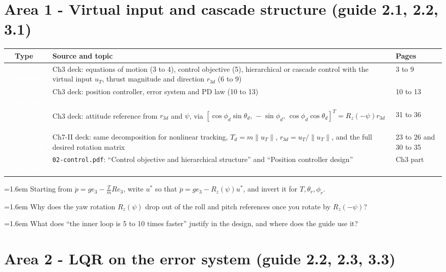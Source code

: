 \documentclass[10pt,a4paper]{article}
\newcommand{\cb}{\raisebox{-0.35ex}{\Large$\square$}}
\newcommand{\srctag}[2]{\colorbox{#1}{\textcolor{white}{\textbf{\scriptsize\,#2\,}}}}
\newcommand{\SLIDES}{\srctag{slides}{SLIDES}}
\newcommand{\NOTES}{\srctag{notes}{NOTES}}
\newcommand{\chk}[1]{\par\noindent\hangindent=1.6em\hangafter=1 \cb\hspace{0.6em}#1}
\begin{document}
\section*{Area 1 - Virtual input and cascade structure \hfill\normalfont\small (guide 2.1, 2.2, 3.1)}

\begin{tabularx}{\textwidth}{@{}C T X l@{}}
\toprule
\cb & Type & Source and topic & Pages\\
\midrule
\cb & \SLIDES & Ch3 deck: equations of motion (3 to 4), control objective (5), hierarchical or cascade control with the virtual input $u_T$, thrust magnitude and direction $r_{3d}$ (6 to 9) & 3 to 9\\
\cb & \SLIDES & Ch3 deck: position controller, error system and PD law (10 to 13) & 10 to 13\\
\cb & \SLIDES & Ch3 deck: attitude reference from $r_{3d}$ and $\psi$, via $[\cos\phi_d\sin\theta_d,\,-\sin\phi_d,\,\cos\phi_d\cos\theta_d]^T=R_z(-\psi)r_{3d}$ & 31 to 36\\
\cb & \SLIDES & Ch7-II deck: same decomposition for nonlinear tracking, $T_d=m\|u_T\|$, $r_{3d}=u_T/\|u_T\|$, and the full desired rotation matrix & 23 to 26 and 30 to 35\\
\cb & \NOTES & \texttt{02-control.pdf}: ``Control objective and hierarchical structure'' and ``Position controller design'' & Ch3 part\\
\bottomrule
\end{tabularx}
\begin{selfcheck}
\chk{Starting from $\ddot p=ge_3-\tfrac{T}{m}Re_3$, write $u^*$ so that $\ddot p=ge_3-R_z(\psi)u^*$, and invert it for $T,\theta_r,\phi_r$.}
\chk{Why does the yaw rotation $R_z(\psi)$ drop out of the roll and pitch references once you rotate by $R_z(-\psi)$?}
\chk{What does ``the inner loop is 5 to 10 times faster'' justify in the design, and where does the guide use it?}
\end{selfcheck}

\section*{Area 2 - LQR on the error system \hfill\normalfont\small (guide 2.2, 2.3, 3.3)}
\end{document}
